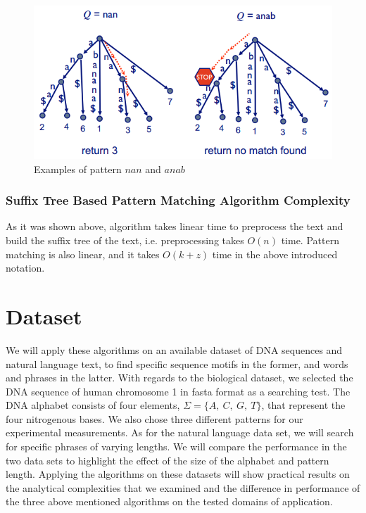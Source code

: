\documentclass[paper=a4, fontsize=11pt]{scrartcl} %
\numberwithin{equation}{section} %
\numberwithin{figure}{section} %
\numberwithin{table}{section} %
\begin{document}
\begin{figure}
\begin{center}
\includegraphics[width=5.5in]{figures/example.png}
\caption{Examples of pattern $nan$ and $anab$}
\label{fig:suffix-tree-matching-ex}
\end{center}
\end{figure}

\subsubsection{Suffix Tree Based Pattern Matching Algorithm Complexity}
As it was shown above, algorithm takes linear time to preprocess the text and build the suffix tree of the text, i.e. preprocessing takes $O(n)$ time. Pattern matching is also linear, and it takes $O(k + z)$ time in the above introduced notation.

\newpage
\section{Dataset}
\par We will apply these algorithms on an available dataset of DNA sequences and natural language text, to find specific sequence motifs in the former, and words and phrases in the latter. With regards to the biological dataset, we selected the DNA sequence of human chromosome 1 in fasta format as a searching test. The DNA alphabet consists of four elements, $\Sigma = \{A,\ C,\ G,\ T\}$, that represent  the four nitrogenous bases. We also chose three different patterns for our experimental measurements. As for the natural language data set, we will search for specific phrases of varying lengths. We will compare the performance in the two data sets to highlight the effect of the size of the alphabet and pattern length. Applying the algorithms on these datasets will show practical results on the analytical complexities that we examined and the difference in performance of the three above mentioned algorithms on the tested domains of application.
\end{document}
